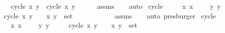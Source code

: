\begin{isabellebody}
\ \ \ {\isachardoublequoteopen}{}\ {\isasymle}\ cycle{}\ {\isacharparenleft}x{\isacharcomma}\ y{\isacharparenright}\ {\isasymand}\ cycle{}\ {\isacharparenleft}x{\isacharcomma}\ y{\isacharparenright}\ {\isacharless}\ {}{\isachardoublequoteclose}\isanewline
%
\isadelimproof
\ \ %
\endisadelimproof
%
\isatagproof
{}\isamarkupfalse%
\ assms\isanewline
\ \ \isamarkupfalse%
\ auto%
\endisatagproof
{\isafoldproof}%
%
\isadelimproof
\isanewline
%
\endisadelimproof
\isanewline
{}\isamarkupfalse%
\ cycle{}{\isacharcolon}\isanewline
\ \ \ {\isachardoublequoteopen}{}\ {\isasymle}\ x{\isachardoublequoteclose}\ {\isachardoublequoteopen}x\ {\isacharless}\ {}{\isachardoublequoteclose}\ {\isachardoublequoteopen}{}\ {\isasymle}\ y{\isachardoublequoteclose}\ {\isachardoublequoteopen}y\ {\isacharless}\ {}{\isachardoublequoteclose}\isanewline
\ \ \ {\isachardoublequoteopen}cycle{}\ {\isacharparenleft}x{\isacharcomma}\ y{\isacharparenright}\ {\isacharequal}\ {}\ {\isasymlongleftrightarrow}\ {\isacharparenleft}x{\isacharcomma}\ y{\isacharparenright}\ {\isasymin}\ set\ {\isacharbrackleft}{\isacharparenleft}{}{\isacharcomma}\ {}{\isacharparenright}{\isacharcomma}\ {\isacharparenleft}{}{\isacharcomma}\ {}{\isacharparenright}{\isacharcomma}\ {\isacharparenleft}{}{\isacharcomma}\ {}{\isacharparenright}{\isacharcomma}\ {\isacharparenleft}{}{\isacharcomma}\ {}{\isacharparenright}{\isacharbrackright}{\isachardoublequoteclose}\isanewline
%
\isadelimproof
\ \ %
\endisadelimproof
%
\isatagproof
{}\isamarkupfalse%
\ assms\isanewline
\ \ \isamarkupfalse%
\ auto\ presburger{\isacharplus}%
\endisatagproof
{\isafoldproof}%
%
\isadelimproof
\isanewline
%
\endisadelimproof
\isanewline
{}\isamarkupfalse%
\ cycle{}{\isacharcolon}\isanewline
\ \ \ {\isachardoublequoteopen}{}\ {\isasymle}\ x{\isachardoublequoteclose}\ {\isachardoublequoteopen}x\ {\isacharless}\ {}{\isachardoublequoteclose}\ {\isachardoublequoteopen}{}\ {\isasymle}\ y{\isachardoublequoteclose}\ {\isachardoublequoteopen}y\ {\isacharless}\ {}{\isachardoublequoteclose}\isanewline
\ \ \ {\isachardoublequoteopen}cycle{}\ {\isacharparenleft}x{\isacharcomma}\ y{\isacharparenright}\ {\isacharequal}\ {}\ {\isasymlongleftrightarrow}\ {\isacharparenleft}x{\isacharcomma}\ y{\isacharparenright}\ {\isasymin}\ set\ {\isacharbrackleft}{\isacharparenleft}{}{\isacharcomma}\ {}{\isacharparenright}{\isacharcomma}\ {\isacharparenleft}{}{\isacharcomma}\ {}{\isacharparenright}{\isacharcomma}\ {\isacharparenleft}{}{\isacharcomma}\ {}{\isacharparenright}{\isacharcomma}\ {\isacharparenleft}{}{\isacharcomma}\ {}{\isacharparenright}{\isacharbrackright}{\isachardoublequoteclose}\isanewline

\end{isabellebody}
